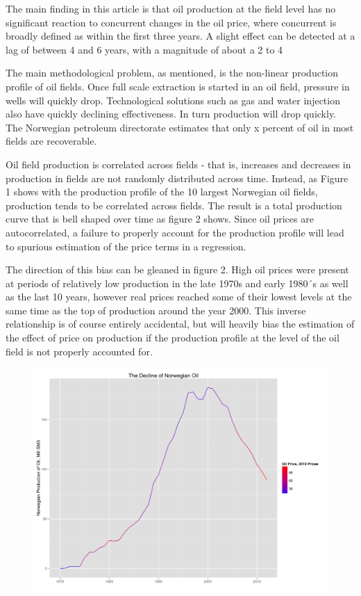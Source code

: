 \documentclass[12pt]{scrartcl} %
\begin{document}
The main finding in this article is that oil production at the field level has no significant reaction to concurrent changes in the oil price, where concurrent is broadly defined as within the first three years.  A slight effect can be detected at a lag of between 4 and 6 years, with a magnitude of about a 2 to 4%

The main methodological problem, as mentioned, is the non-linear production profile of oil fields.  Once full scale extraction is started in an oil field, pressure in wells will quickly drop.  Technological solutions such as gas and water injection also have quickly declining effectiveness.  In turn production will drop quickly.  The Norwegian petroleum directorate estimates that only x percent of oil in most fields are recoverable. 

Oil field production is correlated across fields - that is, increases and decreases in production in fields are not randomly distributed across time.  Instead, as Figure 1 shows with the production profile of the 10 largest Norwegian oil fields, production tends to be correlated across fields.  The result is a total production curve that is bell shaped over time as figure 2 shows.  Since oil prices are autocorrelated, a failure to properly account for the production profile will lead to spurious estimation of the price terms in a regression.  

The direction of this bias can be gleaned in figure 2.  High oil prices were present at periods of relatively low production in the late 1970s and early 1980´s as well as the last 10 years, however real prices reached some of their lowest levels at the same time as the top of production around the year 2000.  This inverse relationship is of course entirely accidental, but will heavily bias the estimation of the effect of price on production if the production profile at the level of the oil field is not properly accounted for.  

\begin{figure}
	\includegraphics[width=.8\textwidth]{oil_decline.png}
\end{figure}
\end{document}

